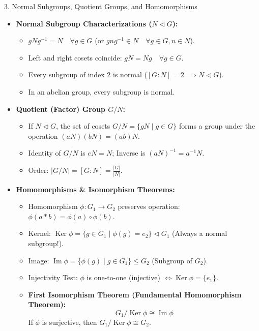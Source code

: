 \documentclass[11pt,a4paper]{article}
\begin{document}
\newpage

\begin{exbox}{3. Normal Subgroups, Quotient Groups, and Homomorphisms}
\begin{itemize}
    \item \textbf{Normal Subgroup Characterizations ($N \triangleleft G$):}
    \begin{itemize}
        \item $gNg^{-1} = N \quad \forall g \in G$ (or $gng^{-1} \in N \quad \forall g \in G, n \in N$).
        \item Left and right cosets coincide: $gN = Ng \quad \forall g \in G$.
        \item Every subgroup of index 2 is normal ($[G : N] = 2 \implies N \triangleleft G$).
        \item In an abelian group, every subgroup is normal.
    \end{itemize}
    \item \textbf{Quotient (Factor) Group $G/N$:}
    \begin{itemize}
        \item If $N \triangleleft G$, the set of cosets $G/N = \{gN \mid g \in G\}$ forms a group under the operation $(aN)(bN) = (ab)N$.
        \item Identity of $G/N$ is $eN = N$; Inverse is $(aN)^{-1} = a^{-1}N$.
        \item Order: $|G/N| = [G : N] = \frac{|G|}{|N|}$.
    \end{itemize}
    \item \textbf{Homomorphisms \& Isomorphism Theorems:}
    \begin{itemize}
        \item Homomorphism $\phi: G_1 \to G_2$ preserves operation: $\phi(a * b) = \phi(a) \circ \phi(b)$.
        \item Kernel: $\operatorname{Ker}\phi = \{g \in G_1 \mid \phi(g) = e_2\} \triangleleft G_1$ (Always a normal subgroup!).
        \item Image: $\operatorname{Im}\phi = \{\phi(g) \mid g \in G_1\} \le G_2$ (Subgroup of $G_2$).
        \item Injectivity Test: $\phi$ is one-to-one (injective) $\iff \operatorname{Ker}\phi = \{e_1\}$.
        \item \textbf{First Isomorphism Theorem (Fundamental Homomorphism Theorem):}
        \begin{equation*}
            G_1 / \operatorname{Ker}\phi \cong \operatorname{Im}\phi
        \end{equation*}
        If $\phi$ is surjective, then $G_1 / \operatorname{Ker}\phi \cong G_2$.
    \end{itemize}
\end{itemize}
\end{exbox}
\end{document}
